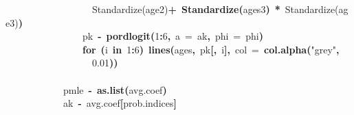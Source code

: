 \documentclass{article}
\makeatletter
\newcommand{\hlnumber}[1]{\textcolor[rgb]{0,0,0}{#1}}%
\newcommand{\hlfunctioncall}[1]{\textcolor[rgb]{.5,0,.33}{\textbf{#1}}}%
\newcommand{\hlstring}[1]{\textcolor[rgb]{.6,.6,1}{#1}}%
\newcommand{\hlkeyword}[1]{\textbf{#1}}%
\newcommand{\hlargument}[1]{\textcolor[rgb]{.69,.25,.02}{#1}}%
\newcommand{\hlassignement}[1]{\textbf{#1}}%
\newcommand{\hlsymbol}[1]{#1}%
\newcommand{\hlstd}[1]{\textcolor[rgb]{0,0,0}{#1}}%
\newenvironment{kframe}{%
 \def\FrameCommand##1{\hskip\@totalleftmargin \hskip-\fboxsep
 \colorbox{shadecolor}{##1}\hskip-\fboxsep
     \hskip-\linewidth \hskip-\@totalleftmargin \hskip\columnwidth}%
 \MakeFramed {\advance\hsize-\width
   \@totalleftmargin\z@ \linewidth\hsize
   \@setminipage}}%
 {\par\unskip\endMakeFramed}
\newenvironment{knitrout}{}{} %
\makeatother
\begin{document}
\begin{knitrout}
{\begin{kframe}
\begin{flushleft}
\hlstd{}{\ }{\ }{\ }{\ }{\ }{\ }{\ }{\ }{\ }{\ }{\ }{\ }{\ }{\ }{\ }{\ }{\ }{\ }\hlsymbol{\usebox{\hlnormalsizeboxbacktick}Standardize(age\usebox{\hlnormalsizeboxhat}2)\usebox{\hlnormalsizeboxbacktick}}{\ }\hlkeyword{+}{\ }\hlfunctioncall{Standardize}\hlkeyword{(}\hlsymbol{ages}\hlkeyword{\usebox{\hlnormalsizeboxhat}}\hlnumber{3}\hlkeyword{)}{\ }\hlkeyword{*}{\ }\hlsymbol{\usebox{\hlnormalsizeboxbacktick}Standardize(age\usebox{\hlnormalsizeboxhat}3)\usebox{\hlnormalsizeboxbacktick}}\hlkeyword{)}\hspace*{\fill}\\
\hlstd{}{\ }{\ }{\ }{\ }{\ }{\ }{\ }{\ }{\ }{\ }{\ }{\ }{\ }{\ }{\ }{\ }\hlsymbol{pk}{\ }\hlassignement{\usebox{\hlnormalsizeboxlessthan}-}{\ }\hlfunctioncall{pordlogit}\hlkeyword{(}\hlnumber{1}\hlkeyword{:}\hlnumber{6}\hlkeyword{,}{\ }\hlargument{a}{\ }\hlargument{=}{\ }\hlsymbol{ak}\hlkeyword{,}{\ }\hlargument{phi}{\ }\hlargument{=}{\ }\hlsymbol{phi}\hlkeyword{)}\hspace*{\fill}\\
\hlstd{}{\ }{\ }{\ }{\ }{\ }{\ }{\ }{\ }{\ }{\ }{\ }{\ }{\ }{\ }{\ }{\ }\hlkeyword{for}{\ }\hlkeyword{(}\hlsymbol{i}{\ }\hlkeyword{in}{\ }\hlnumber{1}\hlkeyword{:}\hlnumber{6}\hlkeyword{)}{\ }\hlfunctioncall{lines}\hlkeyword{(}\hlsymbol{ages}\hlkeyword{,}{\ }\hlsymbol{pk}\hlkeyword{[}\hlkeyword{,}{\ }\hlsymbol{i}\hlkeyword{]}\hlkeyword{,}{\ }\hlargument{col}{\ }\hlargument{=}{\ }\hlfunctioncall{col.alpha}\hlkeyword{(}\hlstring{"grey"}\hlkeyword{,}\hspace*{\fill}\\
\hlstd{}{\ }{\ }{\ }{\ }{\ }{\ }{\ }{\ }{\ }{\ }{\ }{\ }{\ }{\ }{\ }{\ }{\ }{\ }\hlnumber{0.01}\hlkeyword{)}\hlkeyword{)}\hspace*{\fill}\\
\hlstd{}{\ }{\ }{\ }{\ }{\ }{\ }{\ }{\ }{\ }{\ }{\ }{\ }\hlkeyword{\usebox{\hlnormalsizeboxclosebrace}}\hspace*{\fill}\\
\hlstd{}{\ }{\ }{\ }{\ }{\ }{\ }{\ }{\ }{\ }{\ }{\ }{\ }\hlsymbol{pmle}{\ }\hlassignement{\usebox{\hlnormalsizeboxlessthan}-}{\ }\hlfunctioncall{as.list}\hlkeyword{(}\hlsymbol{avg.coef}\hlkeyword{)}\hspace*{\fill}\\
\hlstd{}{\ }{\ }{\ }{\ }{\ }{\ }{\ }{\ }{\ }{\ }{\ }{\ }\hlsymbol{ak}{\ }\hlassignement{\usebox{\hlnormalsizeboxlessthan}-}{\ }\hlsymbol{avg.coef}\hlkeyword{[}\hlsymbol{prob.indices}\hlkeyword{]}\hspace*{\fill}\\

\end{flushleft}
\end{kframe}}
\end{knitrout}
\end{document}
